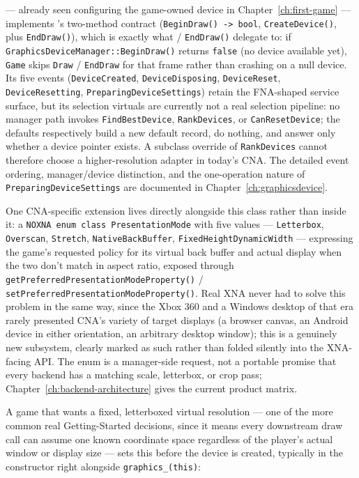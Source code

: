  --- already seen configuring the game-owned device in
Chapter~\ref{ch:first-game} --- implements 's two-method
contract (\texttt{BeginDraw() -> bool}, \texttt{CreateDevice()}, plus \texttt{EndDraw()}),
which is exactly what  / \texttt{EndDraw()} delegate to: if
\texttt{GraphicsDeviceManager::BeginDraw()} returns \texttt{false} (no device available yet),
\texttt{Game} skips \texttt{Draw} / \texttt{EndDraw} for that frame rather than crashing on a
null device. Its five events (\texttt{DeviceCreated}, \texttt{DeviceDisposing},
\texttt{DeviceReset}, \texttt{DeviceResetting}, \texttt{PreparingDeviceSettings}) retain the
FNA-shaped service surface, but its selection virtuals are currently not a real selection
pipeline: no manager path invokes \texttt{FindBestDevice}, \texttt{RankDevices}, or
\texttt{CanResetDevice}; the defaults respectively build a new default record, do nothing, and
answer only whether a device pointer exists. A subclass override of \texttt{RankDevices} cannot
therefore choose a higher-resolution adapter in today's CNA. The detailed event ordering,
manager/device distinction, and the one-operation nature of \texttt{PreparingDeviceSettings}
are documented in Chapter~\ref{ch:graphicsdevice}.

One CNA-specific extension lives directly alongside this class rather than inside it: a
\texttt{NOXNA enum class PresentationMode} with five values ---
\texttt{Letterbox}, \texttt{Overscan}, \texttt{Stretch}, \texttt{NativeBackBuffer},
\texttt{FixedHeight\allowbreak Dynamic\allowbreak Width} --- expressing the game's requested policy for its virtual
back buffer and actual display when the two don't match in aspect ratio, exposed through
\texttt{getPreferred\allowbreak Presentation\allowbreak Mode\allowbreak Property()} /
\texttt{setPreferred\allowbreak Presentation\allowbreak Mode\allowbreak Property()}.
Real XNA never had to solve this problem in the same way, since the Xbox 360 and a Windows
desktop of that era rarely presented CNA's variety of target displays (a browser canvas, an
Android device in either orientation, an arbitrary desktop window); this is a genuinely new
subsystem, clearly marked as such rather than folded silently into the XNA-facing API. The enum
is a manager-side request, not a portable promise that every backend has a matching scale,
letterbox, or crop pass; Chapter~\ref{ch:backend-architecture} gives the current product matrix.

A game that wants a fixed, letterboxed virtual resolution --- one of the more common real
Getting-Started decisions, since it means every downstream draw call can assume one known
coordinate space regardless of the player's actual window or display size --- sets this before
the device is created, typically in the constructor right alongside \texttt{graphics\_(this)}:


